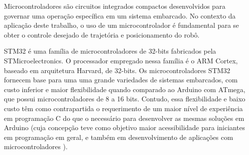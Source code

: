 Microcontroladores são circuitos integrados compactos desenvolvidos para governar
uma operação específica em um sistema embarcado. No contexto da aplicação deste
trabalho, o uso de um microcontrolador é fundamental para se obter o controle
desejado de trajetória e posicionamento do robô.

STM32 é uma família de microcontroladores de 32-bits fabricados pela
STMicroelectronics. O processador empregado nessa família é o ARM Cortex,
baseado em arquitetura Harvard, de 32-bits. Os microcontroladores STM32 fornecem
base para uma uma grande variedades de sistemas embarcados, com custo inferior
e maior flexibilidade quando comparado ao Arduino com ATmega, que possui
microcontroladores de 8 a 16 bits. Contudo, essa flexibilidade e baixo custo têm
como contrapartida o requerimento de um maior nível de experiência em
programação C do que o necessário para desenvolver as mesmas soluções em
Arduino (cuja concepção teve como objetivo maior acessibilidade para iniciantes
em programação em geral, e também  em desenvolvimento de aplicações com
microcontroladores \cite{cortex_m3}).

